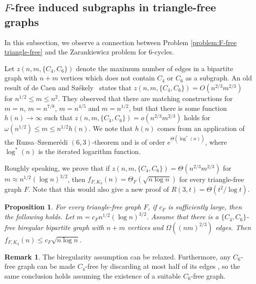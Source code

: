 \documentclass[11pt]{article}
\theoremstyle{plain}
\newtheorem{proposition}[theorem]{Proposition}
\theoremstyle{definition}
\newtheorem{remark}[theorem]{Remark}
\begin{document}
\subsection{$F$-free induced subgraphs in triangle-free graphs} \label{sec:F vs triangle}

In this subsection, we observe a connection between Problem \ref{problem:F-free triangle-free} and the Zarankiewicz problem for $6$-cycles.

Let $z(n,m,\{C_4,C_6\})$ denote the maximum number of edges in a bipartite graph with $n+m$ vertices which does not contain $C_4$ or $C_6$ as a subgraph. An old result of de Caen and Sz\'ekely~\cite{DSz97} states that $z(n,m,\{C_4,C_6\})=O(n^{2/3}m^{2/3})$ for $n^{1/2}\leq m\leq n^2$. They observed that there are matching constructions for $m=n$, $m=n^{7/8}$, $m=n^{4/5}$ and $m=n^{1/2}$, but that there is some function $h(n)\rightarrow \infty$ such that $z(n,m,\{C_4,C_6\})=o(n^{2/3}m^{2/3})$ holds for $\omega(n^{1/2})\leq m\leq n^{1/2}h(n)$. We note that $h(n)$ comes from an application of the Ruzsa--Szemer\'edi $(6,3)$-theorem \cite{RSz78} and is of order $e^{\Theta(\log^*(n))}$, where $\log^*(n)$ is the iterated logarithm function.

Roughly speaking, we prove that if $z(n,m,\{C_4,C_6\})=\Theta(n^{2/3}m^{2/3})$ for $m\approx n^{1/2}(\log n)^{3/2}$, then $f_{F,K_3}(n)=\Theta_F(\sqrt{n \log n})$ for every triangle-free graph $F$. Note that this would also give a new proof of $R(3,t)=\Theta(t^2/\log t)$.

\begin{proposition}
	For every triangle-free graph $F$, if $c_F$ is sufficiently large, then the following holds. Let $m=c_F n^{1/2}(\log n)^{3/2}$. Assume that there is a $\{C_4,C_6\}$-free biregular bipartite graph with $n+m$ vertices and $\Omega((nm)^{2/3})$ edges. Then $f_{F,K_3}(n)\leq c_F\sqrt{n \log n}$.
\end{proposition}

\begin{remark}
	The biregularity assumption can be relaxed. Furthermore, any $C_6$-free graph can be made $C_4$-free by discarding at most half of its edges \cite{Gyori97}, so the same conclusion holds assuming the existence of a suitable $C_6$-free graph.
\end{remark}
\end{document}
